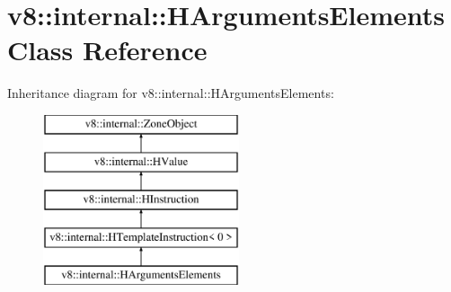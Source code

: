 \hypertarget{classv8_1_1internal_1_1_h_arguments_elements}{}\section{v8\+:\+:internal\+:\+:H\+Arguments\+Elements Class Reference}
\label{classv8_1_1internal_1_1_h_arguments_elements}
Inheritance diagram for v8\+:\+:internal\+:\+:H\+Arguments\+Elements\+:\begin{figure}[H]
\begin{center}
\leavevmode
\includegraphics[height=5.000000cm]{classv8_1_1internal_1_1_h_arguments_elements}
\end{center}
\end{figure}
